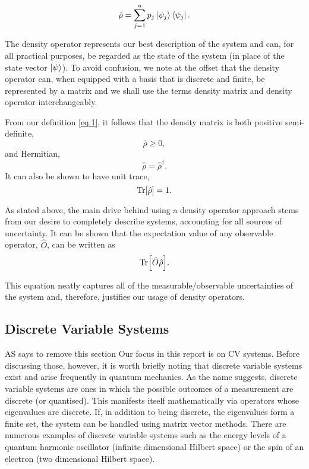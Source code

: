 \documentclass[11pt,a4paper,openbib]{article}
\numberwithin{equation}{section}
\begin{document}
\begin{equation} \label{eq:1}
\hat{\rho} = \sum_{j=1}^{n} p_j \ket{\psi_j}\bra{\psi_j}.
\end{equation}

The density operator represents our best description of the system and can, for all practical purposes, be regarded as the state of the system (in place of the state vector $\ket{\psi}$). To avoid confusion, we note at the offset that the density operator can, when equipped with a basis that is discrete and finite, be represented by a matrix and we shall use the terms density matrix and density operator interchangeably.

From our definition \ref{eq:1}, it follows that the density matrix is both positive semi-definite, 
\begin{equation} \label{eq:2}
\hat{\rho} \geq 0,
\end{equation}
and Hermitian,
\begin{equation} \label{eq:3}
\hat{\rho} = \hat{\rho}^\dagger .
\end{equation}
It can also be shown to have unit trace, 
\begin{equation} \label{eq:4}
\Tr[\hat{\rho}] = 1.
\end{equation}

As stated above, the main drive behind using a density operator approach stems from our desire to completely describe systems, accounting for all sources of uncertainty. It can be shown that the expectation value of any observable operator, $\hat{O}$, can be written as
\begin{equation} \label{eq:5}
\Tr[\hat{O}\hat{\rho}].
\end{equation}

This equation neatly captures all of the measurable/observable uncertainties of the system and, therefore, justifies our usage of density operators.

\subsection{Discrete Variable Systems}
\color{red}AS says to remove this section \color{black}Our focus in this report is on CV systems. Before discussing those, however, it is worth briefly noting that discrete variable systems exist and arise frequently in quantum mechanics. As the name suggests, discrete variable systems are ones in which the possible outcomes of a measurement are discrete (or quantised). This manifests itself mathematically via operators whose eigenvalues are discrete. If, in addition to being discrete, the eigenvalues form a finite set, the system can be handled using matrix vector methods. There are numerous examples of discrete variable systems such as \color{red} the energy levels of a quantum harmonic oscillator (infinite dimensional Hilbert space) or \color{black}the spin of an electron (two dimensional Hilbert space).
\end{document}
